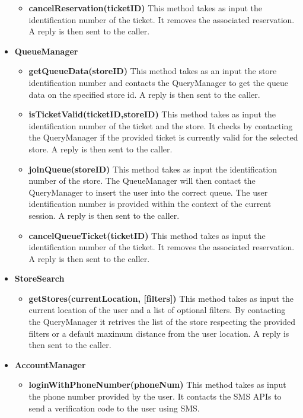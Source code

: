 \begin{itemize}
\begin{itemize}
        \item \textbf{cancelReservation(ticketID)}
        This method takes as input the identification number of the ticket. It removes the associated reservation. 
        A reply is then sent to the caller. 
    \end{itemize}

    \item \textbf{QueueManager}
    \begin{itemize}
        \item \textbf{getQueueData(storeID)}
        This method takes as an input the store identification number and contacts the QueryManager to get the queue data on the specified store id. A reply is then sent to the caller.

        \item \textbf{isTicketValid(ticketID,storeID)}
        This method takes as input the identification number of the ticket and the store. It checks by contacting the QueryManager if the provided ticket is currently valid for the selected store. 
        A reply is then sent to the caller. 

        \item \textbf{joinQueue(storeID)}
        This method takes as input the identification number of the store. The QueueManager will then contact the QueryManager to insert the user into the correct queue. The user identification number is provided within the context of the current session.  
        A reply is then sent to the caller. 

        \item \textbf{cancelQueueTicket(ticketID)}
        This method takes as input the identification number of the ticket. It removes the associated reservation. 
        A reply is then sent to the caller. 
    \end{itemize}

    \item \textbf{StoreSearch}
    \begin{itemize}
        \item \textbf{getStores(currentLocation, [filters])}
        This method takes as input the current location of the user and a list of optional filters. By contacting the QueryManager it retrives the list of the store respecting the provided filters or a default maximum distance from the user location.
        A reply is then sent to the caller. 
    \end{itemize}

    \item \textbf{AccountManager}
    \begin{itemize}
        \item \textbf{loginWithPhoneNumber(phoneNum)}
        This method takes as input the phone number provided by the user. It contacts the SMS APIs to send a verification code to the user using SMS.


\end{itemize}
\end{itemize}
